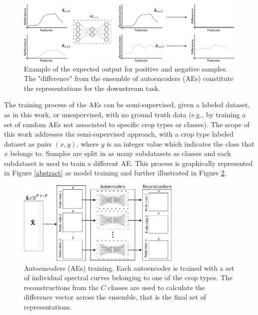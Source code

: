 \documentclass[journal,article,submit,pdftex,moreauthors]{Definitions/mdpi}
\begin{document}
\begin{figure}[H]
	\includegraphics[width=\textwidth]{figures/AE_example_corrected.pdf}
	\caption{Example of the expected output for positive and negative samples. The "difference" from the ensemble of autoencoders (AEs) constitute the representations for the downstream task.}
	\label{errors}
\end{figure}
The training process of the AEs can be semi-supervised, given a labeled dataset, as in this work, or unsupervised, with no ground truth data (e.g., by training a set of random \ac{AEs} not associated to specific crop types or classes). 
The scope of this work addresses the semi-supervised approach, with a crop type labeled dataset as pairs $(x,y)$, where $y$ is an integer value which indicates the class that $x$ belongs to. Samples are split in as many subdatasets as classes and each subdataset is used to train a different AE.
This process is graphically represented in Figure \ref{abstract} as model training and further illustrated in Figure \ref{aes_train}.

\begin{figure}[H]
	\centering
	\includegraphics[width=0.7\textwidth]{figures/training.pdf}
	\caption{Autoencoders (AEs) training. Each autoencoder is trained with a set of individual spectral curves belonging to one of the crop types. The reconstructions from the $C$ classes are used to calculate the difference vector across the ensemble, that is the final set of representations.}    
	\label{aes_train}      
\end{figure}
\end{document}
